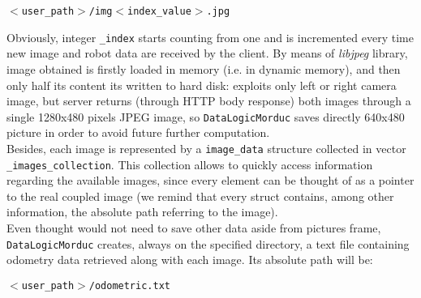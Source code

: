 \begin{center}
  \texttt{$<$user\_path$>$/img$<$index\_value$>$.jpg}
\end{center}

Obviously, integer \texttt{\_index} starts counting from one and is
incremented every time new image and robot data are received by the
client. By means of \textit{libjpeg} library, image obtained is
firstly loaded in memory (i.e. in dynamic memory), and then only half
its content its written to hard disk: \framework{} exploits only
left or right camera image, but server returns (through HTTP body
response) both images through a single 1280x480 pixels JPEG image,
so \texttt{DataLogicMorduc} saves directly 640x480 picture in order
to avoid future further computation.
\\
Besides, each image is represented by a \texttt{image\_data}
structure collected in vector \texttt{\_images\_collection}. This
collection allows to quickly access information regarding the
available images, since every element can be thought of as a pointer
to the real coupled image (we remind that every struct contains, among
other information, the absolute path referring to the image).
\\
Even thought \framework{} would not need to save other data aside
from pictures frame, \texttt{DataLogicMorduc} creates, always on
the specified directory, a text file containing odometry data retrieved
along with each image. Its absolute path will be:

\begin{center}
  \texttt{$<$user\_path$>$/odometric.txt}
\end{center}

